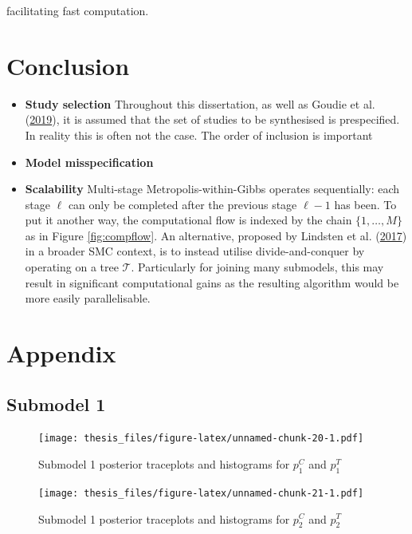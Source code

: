 \documentclass[11pt,]{book}
\begin{document}
facilitating fast computation.

\chapter{\texorpdfstring{Conclusion
\label{chapter:conc}}{Conclusion }}\label{conclusion}

\begin{itemize}
\item
  \textbf{Study selection} Throughout this dissertation, as well as
  Goudie et al. (\protect\hyperlink{ref-goudie2019joining}{2019}), it is
  assumed that the set of studies to be synthesised is prespecified. In
  reality this is often not the case. The order of inclusion is
  important
\item
  \textbf{Model misspecification}
\item
  \textbf{Scalability} Multi-stage Metropolis-within-Gibbs operates
  sequentially: each stage \(\ell\) can only be completed after the
  previous stage \(\ell - 1\) has been. To put it another way, the
  computational flow is indexed by the chain \(\{1, \ldots, M\}\) as in
  Figure \ref{fig:compflow}. An alternative, proposed by Lindsten et al.
  (\protect\hyperlink{ref-lindsten2017divide}{2017}) in a broader SMC
  context, is to instead utilise divide-and-conquer by operating on a
  tree \(\mathcal{T}\). Particularly for joining many submodels, this
  may result in significant computational gains as the resulting
  algorithm would be more easily parallelisable.
\end{itemize}

\appendix


\chapter{\texorpdfstring{Appendix
\label{app:A}}{Appendix }}\label{appendix}

\section{Submodel 1}\label{submodel-1}

\begin{figure}
\centering
\texttt{[image: thesis\_files/figure-latex/unnamed-chunk-20-1.pdf]}
\caption{\label{fig:unnamed-chunk-20}Submodel 1 posterior traceplots and
histograms for \(p_1^C\) and \(p_1^T\)}
\end{figure}

\begin{figure}
\centering
\texttt{[image: thesis\_files/figure-latex/unnamed-chunk-21-1.pdf]}
\caption{\label{fig:unnamed-chunk-21}Submodel 1 posterior traceplots and
histograms for \(p_2^C\) and \(p_2^T\)}
\end{figure}
\end{document}
